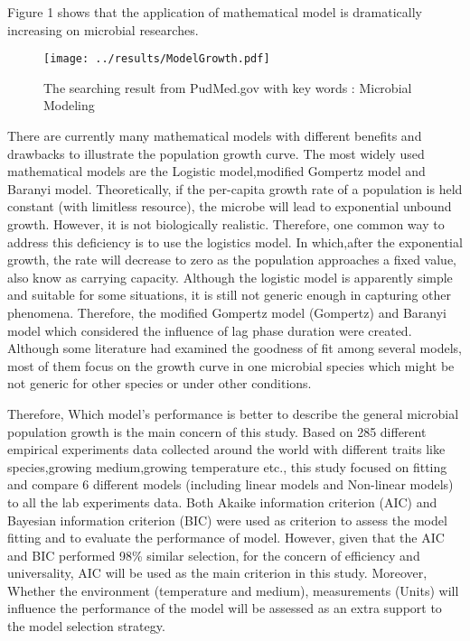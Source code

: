 \documentclass[11pt]{article}
\begin{document}
  Figure 1 shows that the application of mathematical model is dramatically increasing on microbial researches.
  \begin{figure}[H]
    \centering
    \texttt{[image: ../results/ModelGrowth.pdf]}
    \caption{The searching result from PudMed.gov with key words : Microbial Modeling}
  \end{figure}
  
  There are currently many mathematical models with different benefits and drawbacks to illustrate the population growth curve\cite{baranyi_modeling_1993}. The most widely used mathematical models are the Logistic model\cite{zwietering_modeling_1990},modified Gompertz model\cite{zwietering_modeling_1990} and Baranyi model\cite{baranyi_modeling_1993}. Theoretically, if the per-capita growth rate of a population is held constant (with limitless resource), the microbe will lead to exponential unbound growth. However, it is not biologically realistic. Therefore, one common way to address this deficiency is to use the logistics model. In which,after the exponential growth, the rate will decrease to zero as the population approaches a fixed value, also know as carrying capacity. Although the logistic model is apparently simple and suitable for some situations, it is still not generic enough in capturing other phenomena. Therefore, the modified Gompertz model (Gompertz)\cite{zwietering_modeling_1990} and Baranyi model \cite{baranyi_modeling_1993} which considered the influence of lag phase duration were created. Although some literature had examined the goodness of fit among several models\cite{xiong_comparison_1999,buchanan_when_1997}, most of them focus on the growth curve in one microbial species which might be not generic for other species or under other conditions.
 
  Therefore, Which model's performance is better to describe the general microbial population growth is the main concern of this study. Based on 285 different empirical experiments data collected around the world with different traits like species,growing medium,growing temperature etc., this study focused on fitting and compare 6 different models (including linear models and Non-linear models) to all the lab experiments data. Both Akaike information criterion (AIC)  and Bayesian information criterion (BIC) \cite{kuha_aic_2004} were used as criterion to assess the model fitting and to evaluate the performance of model. However, given that the AIC and BIC performed 98\% similar selection, for the concern of efficiency and universality, AIC will be used as the main criterion in this study. Moreover, Whether the environment (temperature and medium), measurements (Units) will influence the performance of the model will be assessed as an extra support to the model selection strategy.
  
\end{document}

